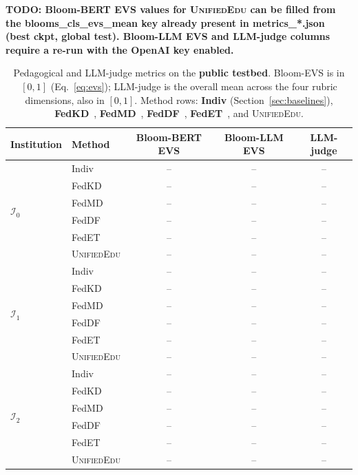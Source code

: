 \documentclass[11pt]{article}
\theoremstyle{plain}
\theoremstyle{definition}
\theoremstyle{remark}
\newcommand{\red}[1]{\textcolor{myred}{\textbf{#1}}}
\newcommand{\UniEdu}{\textsc{UnifiedEdu}}
\begin{document}
\red{TODO: Bloom-BERT EVS values for \UniEdu{} can be filled from the blooms\_cls\_evs\_mean key already present in metrics\_*.json (best ckpt, global test). Bloom-LLM EVS and LLM-judge columns require a re-run with the OpenAI key enabled.}
\begin{table}[t]
\centering
\small
\caption{Pedagogical and LLM-judge metrics on the
\textbf{public testbed}. Bloom-EVS is in $[0, 1]$
(Eq.~\ref{eq:evs}); LLM-judge is the overall mean
across the four rubric dimensions, also in $[0, 1]$.
Method rows: \textbf{Indiv} (Section~\ref{sec:baselines}),
\textbf{FedKD}~\citep{wu2022fedkd},
\textbf{FedMD}~\citep{li2019fedmd},
\textbf{FedDF}~\citep{lin2020feddf},
\textbf{FedET}~\citep{cheng2022fedet}, and
\UniEdu{}.}
\label{tab:public_pedagogical}
\begin{tabular}{llccc}
\toprule
\textbf{Institution} & \textbf{Method} &
\textbf{Bloom-BERT EVS} & \textbf{Bloom-LLM EVS} &
\textbf{LLM-judge} \\
\midrule
\multirow{6}{*}{$\mathcal{I}_0$}
  & Indiv          & -- & -- & -- \\
  & FedKD          & -- & -- & -- \\
  & FedMD          & -- & -- & -- \\
  & FedDF          & -- & -- & -- \\
  & FedET          & -- & -- & -- \\
  & \UniEdu{}      & -- & -- & -- \\
\midrule
\multirow{6}{*}{$\mathcal{I}_1$}
  & Indiv          & -- & -- & -- \\
  & FedKD          & -- & -- & -- \\
  & FedMD          & -- & -- & -- \\
  & FedDF          & -- & -- & -- \\
  & FedET          & -- & -- & -- \\
  & \UniEdu{}      & -- & -- & -- \\
\midrule
\multirow{6}{*}{$\mathcal{I}_2$}
  & Indiv          & -- & -- & -- \\
  & FedKD          & -- & -- & -- \\
  & FedMD          & -- & -- & -- \\
  & FedDF          & -- & -- & -- \\
  & FedET          & -- & -- & -- \\
  & \UniEdu{}      & -- & -- & -- \\
\bottomrule
\end{tabular}
\end{table}
\end{document}
